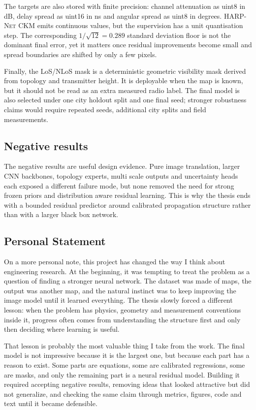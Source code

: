 The targets are also stored with finite precision: channel attenuation as uint8
in dB, delay spread as uint16 in ns and angular spread as uint8 in degrees.
\textsc{HARP-Net CKM} emits continuous values, but the supervision has a unit
quantisation step. The corresponding \(1/\sqrt{12}=0.289\) standard deviation
floor is not the dominant final error, yet it matters once residual
improvements become small and spread boundaries are shifted by only a few
pixels.

Finally, the LoS/NLoS mask is a deterministic geometric visibility mask derived
from topology and transmitter height. It is deployable when the map is known,
but it should not be read as an extra measured radio label. The final model is
also selected under one city holdout split and one final seed; stronger
robustness claims would require repeated seeds, additional city splits and
field measurements.

\subsection{Negative results}

The negative results are useful design evidence. Pure image translation, larger
CNN backbones, topology experts, multi scale outputs and uncertainty heads each
exposed a different failure mode, but none removed the need for strong frozen
priors and distribution aware residual learning. This is why the thesis ends
with a bounded residual predictor around calibrated propagation structure
rather than with a larger black box network.

\subsection{Personal Statement}

On a more personal note, this project has changed the way I think about
engineering research. At the beginning, it was tempting to treat the problem as
a question of finding a stronger neural network. The dataset was made of maps,
the output was another map, and the natural instinct was to keep improving the
image model until it learned everything. The thesis slowly forced a different
lesson: when the problem has physics, geometry and measurement conventions
inside it, progress often comes from understanding the structure first and only
then deciding where learning is useful.

That lesson is probably the most valuable thing I take from the work. The final
model is not impressive because it is the largest one, but because each part
has a reason to exist. Some parts are equations, some are calibrated
regressions, some are masks, and only the remaining part is a neural residual
model. Building it required accepting negative results, removing ideas that
looked attractive but did not generalize, and checking the same claim through
metrics, figures, code and text until it became defensible.

